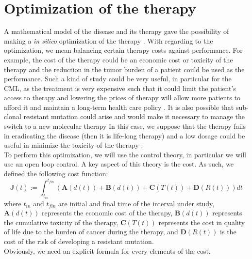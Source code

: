 \documentclass[a4paper,10pt]{article}
\begin{document}
\section{Optimization of the therapy}
A mathematical model of the disease and its therapy gave the possibility of making
a \textit{in silico} optimization of the therapy 
\cite{tannenbaum2018control, nanda2007optimal}. 
With regarding to the optimization, we mean 
balancing certain therapy costs against performance. For example,
the cost
of the therapy could be an economic cost 
\cite{experts2013price, jabbour2017evaluation, himmelstein2009medical, chen2017journey, gomez2017insights} 
or toxicity of the therapy 
\cite{zhu2014clinical, hu2012mechanistic, breccia2008differences, cohen2002approval}
and 
the reduction in the tumor burden of a patient could be used as the performance. 
Such a kind of study could be very useful,
in particular for the CML, 
as the treatment is very expensive
\cite{experts2013price, jabbour2017evaluation, chen2017journey} such
that it could limit the patient’s access to therapy 
\cite{gomez2017insights, himmelstein2009medical} and 
lowering the prices of therapy will
allow more patients to afford it and 
maintain a long-term health care policy \cite{fojo2009much}. It is also possible that
sub-clonal resistant mutation 
could arise and would make it necessary to manage
the switch to a new molecular therapy \cite{cortes2016evaluating} 
In this case, we suppose that 
the therapy fails in eradicating the disease (then it is life-long therapy)
and a low dosage could be useful 
in minimize the toxicity of the therapy \cite{faber2016lower}.\\
To perform this optimization, we will use the control theory, in particular we will 
use an open loop control. A key aspect of this theory is the cost.
As such, we defined the following cost function:
\begin{equation}
\mathbb{J}(t):=\int_{t_{in}}^{t_{fin}}\left(\mathbf{A}(d(t))+\mathbf{B}(d(t))+\mathbf{C}(T(t))
+\mathbf{D}(R(t)) \right) dt
\end{equation}
where $t_{in}$ and $t_{fin}$ are initial and final time of the interval under study,
$\mathbf{A}(d(t))$ represents the economic cost of the therapy,
$\mathbf{B}(d(t))$ represents the cumulative toxicity of the therapy,
$\mathbf{C}(T(t))$ represents the 
cost in quality of life due to the burden of cancer during the therapy, and 
$\mathbf{D}(R(t))$ is the cost of the risk of developing a resistant mutation.\\
Obviously, we need an explicit formula for every elements of the cost.
\end{document}
